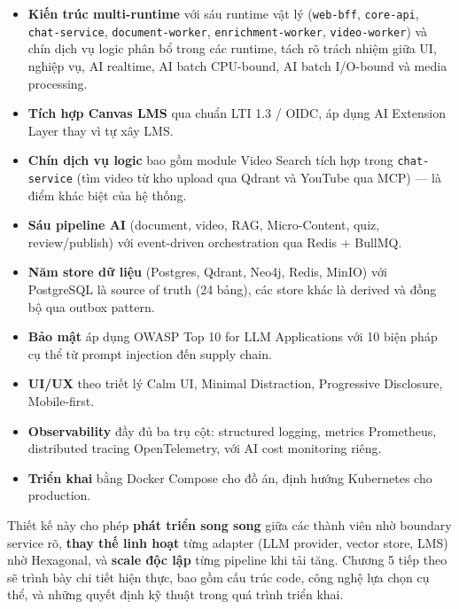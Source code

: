 \begin{itemize}
    \item \textbf{Kiến trúc multi-runtime} với sáu runtime vật lý
          (\texttt{web-bff}, \texttt{core-api}, \texttt{chat-service},
          \texttt{document-worker}, \texttt{enrichment-worker},
          \texttt{video-worker}) và chín dịch vụ logic phân bổ trong các
          runtime, tách rõ trách nhiệm giữa UI, nghiệp vụ, AI realtime,
          AI batch CPU-bound, AI batch I/O-bound và media processing.
    \item \textbf{Tích hợp Canvas LMS} qua chuẩn LTI 1.3 / OIDC, áp dụng
          AI Extension Layer thay vì tự xây LMS.
    \item \textbf{Chín dịch vụ logic} bao gồm module Video Search tích hợp
          trong \texttt{chat-service} (tìm video từ kho upload qua Qdrant
          và YouTube qua MCP) --- là điểm khác biệt của hệ thống.
    \item \textbf{Sáu pipeline AI} (document, video, RAG,
          Micro-Content, quiz, review/publish) với event-driven
          orchestration qua Redis + BullMQ.
    \item \textbf{Năm store dữ liệu} (Postgres, Qdrant, Neo4j, Redis,
          MinIO) với PostgreSQL là source of truth (24 bảng), các store
          khác là derived và đồng bộ qua outbox pattern.
    \item \textbf{Bảo mật} áp dụng OWASP Top 10 for LLM Applications với
          10 biện pháp cụ thể từ prompt injection đến supply chain.
    \item \textbf{UI/UX} theo triết lý Calm UI, Minimal Distraction,
          Progressive Disclosure, Mobile-first.
    \item \textbf{Observability} đầy đủ ba trụ cột: structured logging,
          metrics Prometheus, distributed tracing OpenTelemetry, với
          AI cost monitoring riêng.
    \item \textbf{Triển khai} bằng Docker Compose cho đồ án, định hướng
          Kubernetes cho production.
\end{itemize}

Thiết kế này cho phép \textbf{phát triển song song} giữa các thành viên
nhờ boundary service rõ, \textbf{thay thế linh hoạt} từng adapter (LLM
provider, vector store, LMS) nhờ Hexagonal, và \textbf{scale độc lập}
từng pipeline khi tải tăng. Chương 5 tiếp theo sẽ trình bày chi tiết
hiện thực, bao gồm cấu trúc code, công nghệ lựa chọn cụ thể, và những
quyết định kỹ thuật trong quá trình triển khai.
